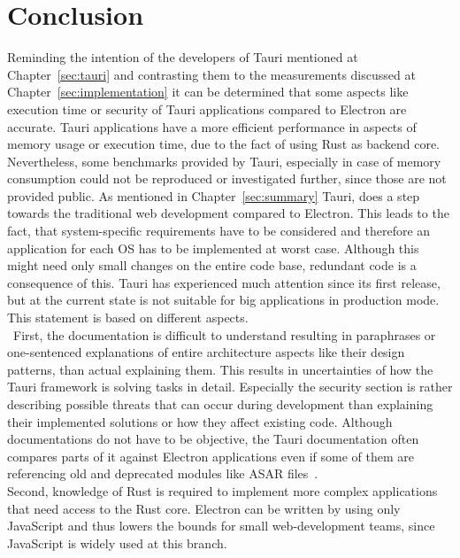 \section{Conclusion}
\label{sec:conclusion}
Reminding the intention of the developers of Tauri mentioned at Chapter~\ref{sec:tauri} and contrasting them to the measurements discussed at Chapter~\ref{sec:implementation}
it can be determined that some aspects like execution time or security of Tauri applications compared to Electron are accurate.
Tauri applications have a more efficient performance in aspects of memory usage or execution time, due to the fact of using Rust as backend core.
Nevertheless, some benchmarks provided by Tauri, especially in case of memory consumption could not be reproduced or investigated further, since those are not provided public.
As mentioned in Chapter~\ref{sec:summary} Tauri, does a step towards the traditional web development compared to Electron.
This leads to the fact, that system-specific requirements have to be considered and therefore an application for each \ac{OS} has to be implemented at worst case.
Although this might need only small changes on the entire code base, redundant code is a consequence of this.
Tauri has experienced much attention since its first release, but at the current state is not suitable for big applications in production mode.
This statement is based on different aspects. \\ \
First, the documentation is difficult to understand resulting in paraphrases or one-sentenced explanations of entire architecture aspects like their design patterns, than actual explaining them.
This results in uncertainties of how the Tauri framework is solving tasks in detail.
Especially the security section is rather describing possible threats that can occur during development than explaining their implemented solutions or how they affect existing code.
Although documentations do not have to be objective, the Tauri documentation often compares parts of it against Electron applications even if some of them are referencing old and deprecated modules like ASAR files~\cite{tauri}. \\
Second, knowledge of Rust is required to implement more complex applications that need access to the Rust core.
Electron can be written by using only JavaScript and thus lowers the bounds for small web-development teams, since JavaScript is widely used at this branch.
